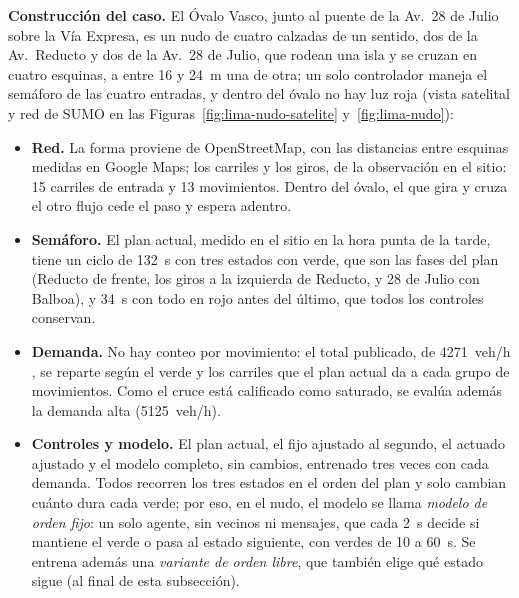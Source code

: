 \noindent\textbf{Construcción del caso.} El Óvalo Vasco, junto al
puente de la Av.~28 de Julio sobre la Vía Expresa, es un nudo de cuatro
calzadas de un sentido, dos de la Av.~Reducto y dos de la Av.~28 de
Julio, que rodean una isla y se cruzan en cuatro esquinas, a entre 16 y
24~m una de otra; un solo controlador maneja el semáforo de las cuatro
entradas, y dentro del óvalo no hay luz roja (vista satelital y red de
SUMO en las Figuras~\ref{fig:lima-nudo-satelite} y~\ref{fig:lima-nudo}):
\begin{itemize}
  \item \textbf{Red.} La forma proviene de OpenStreetMap, con las
    distancias entre esquinas medidas en Google Maps; los carriles y los
    giros, de la observación en el sitio: 15 carriles de entrada y 13
    movimientos.
    Dentro del óvalo, el que gira y cruza el otro flujo cede el paso y
    espera adentro.
  \item \textbf{Semáforo.} El plan actual, medido en el sitio en la hora
    punta de la tarde, tiene un ciclo de 132~s con tres estados con
    verde, que son las fases del plan (Reducto de frente, los giros a la
    izquierda de Reducto, y 28 de Julio con Balboa), y 34~s con todo en
    rojo antes del último, que todos los controles conservan.
  \item \textbf{Demanda.} No hay conteo por movimiento: el total
    publicado, de 4271~veh/h \citep{Miraflores2017_PMU}, se reparte
    según el verde y los carriles que el plan actual da a cada grupo de
    movimientos. Como el cruce está calificado como saturado, se evalúa
    además la demanda alta (5125~veh/h).
  \item \textbf{Controles y modelo.} El plan actual, el fijo ajustado al
    segundo, el actuado ajustado y el modelo completo, sin cambios,
    entrenado tres veces con cada demanda. Todos recorren los tres
    estados en el orden del plan y solo cambian cuánto dura cada verde;
    por eso, en el nudo, el modelo se llama \emph{modelo de orden fijo}:
    un solo agente, sin vecinos ni mensajes, que cada 2~s decide si
    mantiene el verde o pasa al estado siguiente, con verdes de 10 a
    60~s. Se entrena además una \emph{variante de orden libre}, que
    también elige qué estado sigue (al final de esta subsección).
\end{itemize}

